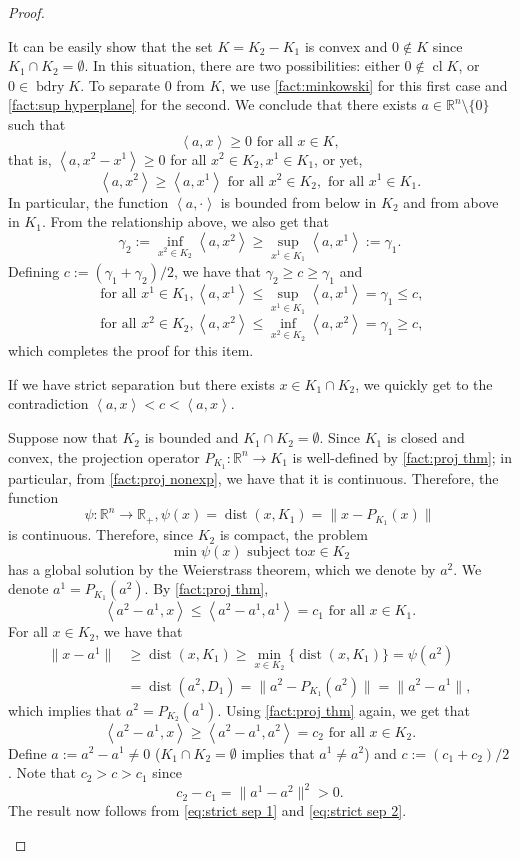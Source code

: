 \documentclass[smallextended,numbook,nospthms]{svjour3}
\theoremstyle{plain}
\theoremstyle{definition}
\def\RR{\mathds R}
\DeclareMathOperator{\dist}{dist}
\newcommand{\scal}[2]{\left\langle{#1},{#2}  \right\rangle}
\begin{document}
\begin{proof}
	\begin{listi}
		\item It can be easily show that the set $K=K_2 - K_1$ is convex and $0 \notin K$ since $K_1 \cap K_2 = \emptyset$. In this situation, there are two possibilities: either $0 \notin \operatorname{cl} K$, or $0 \in \operatorname{bdry} K$. To separate $0$ from $K$, we use \cref{fact:minkowski} for this first case and \cref{fact:sup hyperplane} for the second. We conclude that there exists $a \in \RR^n \setminus \{0\}$ such that
		\[
		\scal{a}{x} \geq 0 \text{ for all } x \in K,
		\]
		that is, $\scal{a}{x^2-x^1}\geq 0$ for all $x^2 \in K_2, x^1 \in K_1$, or yet,
		\[
		\scal{a}{x^2} \geq \scal{a}{x^1} \text{ for all } x^2 \in K_2, \text{ for all } x^1 \in K_1.
		\]
		In particular, the function $\scal{a}{\cdot}$ is bounded from below in $K_2$ and from above in $K_1$. From the relationship above, we also get that
		\[
		\gamma_{2}:=\inf_{x^2 \in K_2} \scal{a}{x^2} \geq \sup_{x^1 \in K_1} \scal{a}{x^1}:=\gamma_{1}.
		\]
		Defining $c:=(\gamma_{1}+\gamma_{2})/2$, we have that $\gamma_{2} \geq c \geq \gamma_{1}$ and 
		\[
		\text{ for all } x^1 \in K_1, \scal{a}{x^1} \leq \sup_{x^1 \in K_1} \scal{a}{x^1}=\gamma_{1} \leq c,
		\]
		\[
		\text{ for all } x^2 \in K_2, \scal{a}{x^2} \leq \inf_{x^2 \in K_2} \scal{a}{x^2}=\gamma_{1} \geq c,
		\]
		which completes the proof for this item.
		\item If we have strict separation but there exists $x \in K_1 \cap K_2$, we quickly get to the contradiction $\scal{a}{x} < c < \scal{a}{x}$.
	
		Suppose now that $K_2$ is bounded and $K_1 \cap K_2 = \emptyset$. Since $K_1$ is closed and convex, the projection operator $P_{K_1}:\RR^n \rightarrow K_1$ is well-defined by \cref{fact:proj thm}; in particular, from \cref{fact:proj nonexp}, we have that it is continuous. Therefore, the function
		\[
		\psi:\RR^n \rightarrow \RR_{+}, \psi(x)=\dist(x,K_1)=\|x-P_{K_1}(x)\|
		\]
		is continuous. Therefore, since $K_2$ is compact, the problem
		\[
		\min \psi(x) \text{ subject to} x \in K_2
		\]
		has a global solution by the Weierstrass theorem, which we denote by $a^2$. We denote $a^1=P_{K_1}(a^2)$. By \cref{fact:proj thm},
		\[
		\scal{a^2-a^1}{x} \leq \scal{a^2-a^1}{a^1}=c_1 \text{ for all } x \in K_1. \label{eq:strict sep 1}
		\]
		For all $x \in K_2$, we have that
		\begin{align}
			\|x-a^1\| &\geq \dist(x,K_1) \geq \min_{x \in K_2}\{\dist(x,K_1)\}=\psi(a^2) \\
				&= \dist(a^2,D_1)=\|a^2-P_{K_1}(a^2)\|=\|a^2-a^1\|,
		\end{align}
		which implies that $a^2=P_{K_2}(a^1)$. Using \cref{fact:proj thm} again, we get that
		\[
		\scal{a^2-a^1}{x}\geq \scal{a^2-a^1}{a^2}=c_2 \text{ for all } x \in K_2 \label{eq:strict sep 2}.
		\]
		Define $a:=a^2-a^1 \not=0$ ($K_1 \cap K_2 = \emptyset$ implies that $a^1 \not= a^2$) and $c:=(c_1+c_2)/2$. Note that $c_2>c>c_1$ since
		\[
		c_2 - c_1 = \|a^1-a^2\|^2>0.
		\]
		The result now follows from \cref{eq:strict sep 1} and \cref{eq:strict sep 2}.
	\end{listi}
\end{proof}
\end{document}
